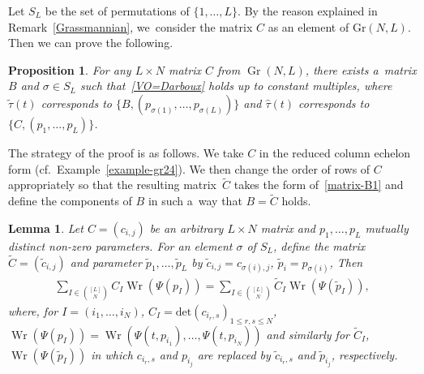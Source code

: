 \documentclass[10pt,a4paper]{amsart}
\numberwithin{equation}{section}
\newtheorem{Lemma}[Theorem]{Lemma}
\newtheorem{Proposition}[Theorem]{Proposition}
\theoremstyle{definition}
\begin{document}
Let $S_L$ be the set of permutations of $\{1,\dots ,L\}$.
By the reason explained in Remark~\ref{Grassmannian}, we~consider the matrix $C$ as an
element of $\mathrm{Gr}(N,L)$.
Then we can prove the following.

\begin{Proposition}\label{BC-equivalence}
For any $L\times N$ matrix $C$ from
$\operatorname{Gr}(N,L)$, there exists a~matrix $B$ and $\sigma\in S_L$ such that~\eqref{VO=Darboux} holds up to constant multiples, where $\tilde{\tau}(t)$ corresponds to
$\{B,(p_{\sigma(1)},\dots ,p_{\sigma(L)})\}$ and $\widehat{\tau}(t)$ corresponds to~${\{C,(p_1,\dots ,p_L)\}}$.
\end{Proposition}
The strategy of the proof is as follows.
We take $C$ in the reduced column
echelon form (cf.\ Example~\ref{example-gr24}).
We then change the order of rows of $C$
appropriately so that the resulting matrix~$\tilde{C}$ takes the form of~\eqref{matrix-B1} and define the components of $B$ in such a~way that $B=\tilde{C}$ holds.



\begin{Lemma}\label{BC-equivalence-2}
Let $C=(c_{i,j})$ be an arbitrary $L\times N$ matrix and $p_1,\dots ,p_L$ mutually distinct non-zero parameters.
For an element $\sigma$ of $S_L$, define the matrix $\tilde{C}=(\tilde{c}_{i,j})$ and parameter
$\tilde{p}_1,\dots ,\tilde{p}_L$
by
$
\tilde{c}_{i,j}=c_{\sigma(i),j}$,
$
\tilde{p}_i=p_{\sigma(i)}$,
Then
\begin{gather*}
\sum_{I\in \binom{[L]}{N}} C_I\operatorname{Wr}(\Psi(p_I))
=
\sum_{I\in \binom{[L]}{N}} \tilde{C}_I\operatorname{Wr}(\Psi(\tilde{p}_I)),
\end{gather*}
where, for $I=(i_1,\dots ,i_N)$, $C_I=\mathrm{det}(c_{i_r,s})_{1\leq r,s\leq N}$,
$\operatorname{Wr}(\Psi(p_I))=\operatorname{Wr}(\Psi(t,p_{i_1}),\dots ,\Psi(t,p_{i_N}))$ and similarly for
$\tilde{C}_I$,
$\operatorname{Wr}(\Psi(\tilde{p}_I))$ in which $c_{i_r,s}$ and $p_{i_j}$ are
 replaced by $\tilde{c}_{i_r,s}$ and $\tilde{p}_{i_j}$, respectively.
\end{Lemma}
\end{document}
